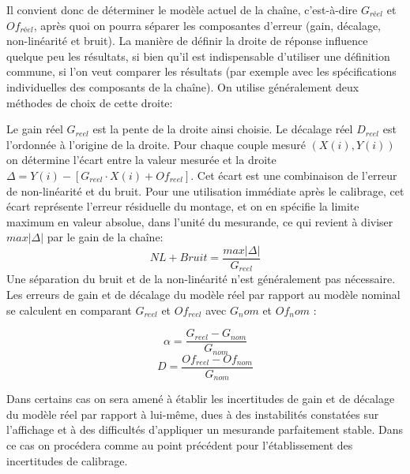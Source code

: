 Il convient donc de déterminer le modèle actuel de la chaîne, c'est-à-dire $G_{réel}$ et $Of_{réel}$, après quoi on pourra séparer les composantes d'erreur (gain, décalage, non-linéarité et bruit). La manière de définir la droite de réponse influence quelque peu les résultats, si bien qu'il est indispensable d'utiliser une définition commune, si l'on veut comparer les résultats (par exemple avec les spécifications individuelles des composants de la chaîne). On utilise généralement deux méthodes de choix de cette droite:
\begin{center}
\end{center}

Le gain réel $G_{reel}$ est la pente de la droite ainsi choisie. Le décalage réel $D_{reel}$ est l'ordonnée à l'origine de la droite. Pour chaque couple mesuré $(X(i),Y(i))$ on détermine l'écart entre la valeur mesurée et la droite $\Delta = Y(i) - [G_{reel}\cdot X(i) + Of_{reel}]$. Cet écart est une combinaison de l'erreur de non-linéarité et du bruit. Pour une utilisation immédiate après le calibrage, cet écart représente l'erreur résiduelle du montage, et on en spécifie la limite maximum en valeur absolue, dans l'unité du mesurande, ce qui revient à diviser $max{|\Delta|}$ par le gain de la chaîne:
\[
	NL+Bruit = \frac{max{|\Delta|}}{G_{reel}}
\]
Une séparation du bruit et de la non-linéarité n'est généralement pas nécessaire.
Les erreurs de gain et de décalage du modèle réel par rapport au modèle nominal se calculent en comparant $G_{reel}$ et $Of_{reel}$ avec $G_nom$ et $Of_nom$ :

\[\alpha =  \frac{G_{reel}-G_{nom}}{G_{nom}}	 \]
\[D =  \frac{Of_{reel}-Of_{nom}}{G_{nom}} \]

Dans certains cas on sera amené à établir les incertitudes de gain et de décalage du modèle réel par rapport à lui-même, dues à des instabilités constatées sur l'affichage et à des difficultés d'appliquer un mesurande parfaitement stable. Dans ce cas on procédera comme au point précédent pour l'établissement des incertitudes de calibrage.

